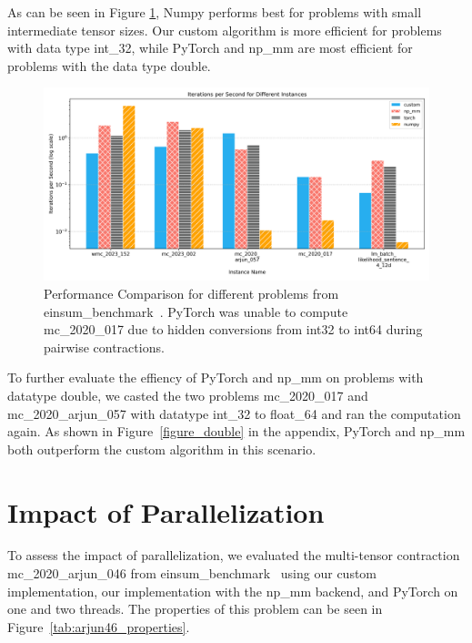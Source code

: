 \sloppy
\noindent As can be seen in Figure \ref{e_b}, Numpy performs best for problems with small intermediate tensor sizes. Our custom algorithm is more efficient for problems with data type int\_32, while PyTorch and np\_mm are most efficient for problems with the data type double.
\begin{figure}[H]
    \centering
    \includegraphics[width=1\textwidth]{images/einsum_five.png} 
    \caption{Performance Comparison for different problems from einsum\_benchmark~\cite{blacher2024einsum}. PyTorch was unable to compute mc\_2020\_017 due to hidden conversions from int32 to int64 during pairwise contractions.}
    \label{e_b}
\end{figure}

\noindent To further evaluate the effiency of PyTorch and np\_mm on problems with datatype double, we casted the two problems mc\_2020\_017 and mc\_2020\_arjun\_057 with datatype int\_32 to float\_64 and ran the computation again. As shown in Figure~\ref{figure_double} in the appendix, PyTorch and np\_mm both outperform the custom algorithm in this scenario.

\section{Impact of Parallelization}

\noindent To assess the impact of parallelization, we evaluated the multi-tensor contraction mc\_2020\_arjun\_046 from einsum\_benchmark~\cite{blacher2024einsum} using our custom implementation, our implementation with the np\_mm backend, and PyTorch on one and two threads. The properties of this problem can be seen in Figure~\ref{tab:arjun46_properties}. 

